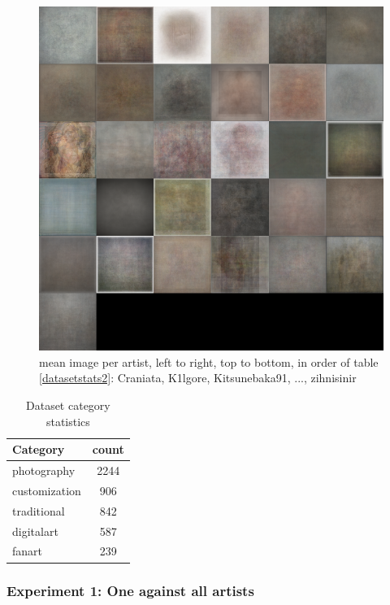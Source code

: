 \begin{figure}[htb]
  \includegraphics[width=1\linewidth]{img/datasetAvg.png}
  \caption{mean image per artist, left to right, top to bottom, in order of table \ref{datasetstats2}: Craniata, K1lgore, Kitsunebaka91, ..., zihnisinir }
  \label{fig:avgDataset}
\end{figure}


\begin{table}[htb]
    \centering
    \begin{tabular}
        { | l | c | } 
        \hline
        Category & count \\
        \hline
        photography & 2244 \\ 
        customization & 906 \\ 
        traditional & 842 \\ 
        digitalart & 587 \\ 
        fanart & 239 \\ 
        \hline 
    \end{tabular}
    \caption{Dataset category statistics}
    \label{datasetstats}
\end{table}

\subsubsection{Experiment 1: One against all artists}


